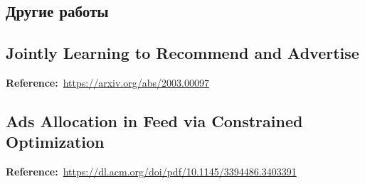 \begin{bibunit}[plainnat]













\chapter{Другие работы}

\section*{Jointly Learning to Recommend and Advertise}

\textbf{Reference:}~\url{https://arxiv.org/abs/2003.00097}

\section*{Ads Allocation in Feed via Constrained Optimization}

\textbf{Reference:}~\url{https://dl.acm.org/doi/pdf/10.1145/3394486.3403391}

\end{bibunit}
